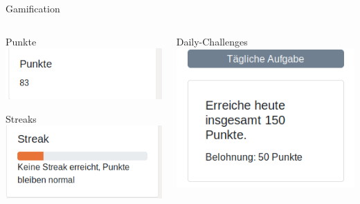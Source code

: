 \documentclass[xcolor=dvipsnames]{beamer}
\begin{document}
    \begin{frame}{Gamification}
         \begin{columns}
            \begin{column}{0.5\textwidth}
                \begin{block}{Punkte}
                    \center
                    \includegraphics[width=(\textwidth / 2)]{img/points.png}
                \end{block}
                \begin{block}{Streaks}
                    \center
                    \includegraphics[width=(\textwidth / 2)]{img/streak.png}
                \end{block}
            \end{column}
            \begin{column}{0.5\textwidth}
                \begin{block}{Daily-Challenges}
                    \center
                    \includegraphics[width=(\textwidth / 2)]{img/daily.png}
                \end{block}
            \end{column}
        \end{columns}

    \end{frame}
\end{document}
